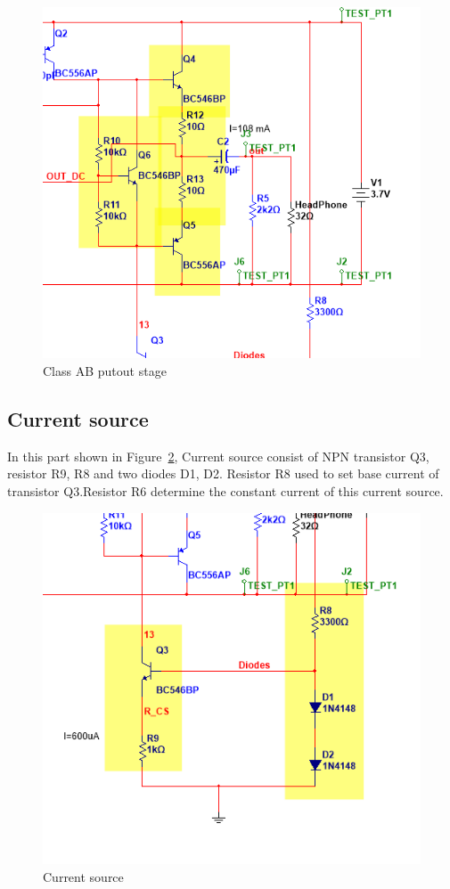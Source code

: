 \begin{figure}[htbp]
	\centering
	\includegraphics[scale=0.8]{"../Photo/Chap5/Class AB outout stage"}
	\caption{Class AB putout stage}
	\label{fig:Class AB outout stage}
\end{figure}

\subsection{Current source }  
In this part shown in Figure~\ref{fig:Current source}, Current source consist of NPN transistor Q3, resistor R9, R8 and two diodes D1, D2.
Resistor R8 used to set base current of transistor Q3.Resistor R6 determine the constant current of this current source.

\begin{figure}[htbp]
	\centering
	\includegraphics[scale=0.8]{"../Photo/Chap5/Current source"}
	\caption{Current source}
	\label{fig:Current source}
\end{figure}

